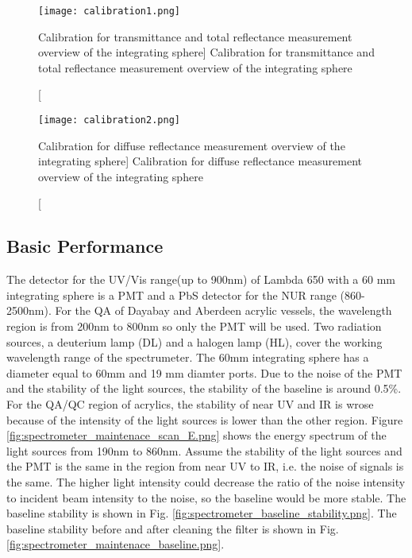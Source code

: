 \begin{figure}
    \centering
    \texttt{[image: calibration1.png]}
    \caption
    [Calibration for transmittance and total reflectance measurement overview of the integrating sphere]
    {Calibration for transmittance and total reflectance measurement overview of the integrating sphere}
    \label{fig:calibration1.png}
    \end{figure}

\begin{figure}
    \centering
    \texttt{[image: calibration2.png]}
    \caption
    [Calibration for diffuse reflectance measurement overview of the integrating sphere]
    {Calibration for diffuse reflectance measurement overview of the integrating sphere}
    \label{fig:calibration2.png}
    \end{figure}



\subsection{Basic Performance}

The detector for the UV/Vis range(up to 900nm) of Lambda 650 with a 60 mm integrating sphere
is a PMT and a PbS detector for the NUR range (860-2500nm). For the QA of Dayabay and Aberdeen acrylic vessels, the wavelength region is from
200nm to 800nm so only the PMT will be used.
Two radiation sources, a deuterium lamp (DL) and a halogen lamp (HL), cover the working wavelength range of the spectrumeter.
The 60mm integrating sphere has a diameter equal to 60mm and 19 mm diamter ports.
Due to the noise of the PMT and the stability of the
light sources, the stability of the baseline is around 0.5\%.
For the QA/QC region of acrylics, the stability of near UV and IR is wrose because
of the intensity of the light sources is lower than the other region.
Figure \ref{fig:spectrometer_maintenace_scan_E.png} shows the energy spectrum of the light sources from 190nm to
860nm. Assume the stability of the light sources and the PMT is the same in
the region from near UV to IR, i.e. the noise of signals is the same. The higher
light intensity could decrease the ratio of the noise intensity to incident beam intensity to the noise,
so the baseline would be more stable. The baseline stability is shown in Fig. \ref{fig:spectrometer_baseline_stability.png}.
The baseline stability before and after cleaning the filter is shown in Fig. \ref{fig:spectrometer_maintenace_baseline.png}.


